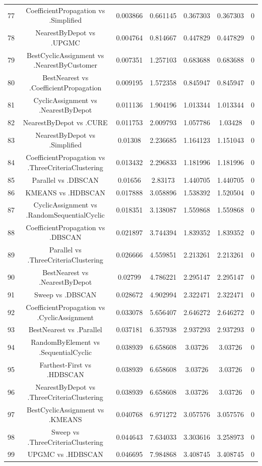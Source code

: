 \documentclass[a4paper,10pt]{article}
\begin{document}
\begin{landscape}
\begin{table}[!htp]
\begin{tabular}{ccccccc}
77&CoefficientPropagation vs .Simplified&0.003866&0.661145&0.367303&0.367303&0\\
78&NearestByDepot vs .UPGMC&0.004764&0.814667&0.447829&0.447829&0\\
79&BestCyclicAssignment vs .NearestByCustomer&0.007351&1.257103&0.683688&0.683688&0\\
80&BestNearest vs .CoefficientPropagation&0.009195&1.572358&0.845947&0.845947&0\\
81&CyclicAssignment vs .NearestByDepot&0.011136&1.904196&1.013344&1.013344&0\\
82&NearestByDepot vs .CURE&0.011753&2.009793&1.057786&1.03428&0\\
83&NearestByDepot vs .Simplified&0.01308&2.236685&1.164123&1.151043&0\\
84&CoefficientPropagation vs .ThreeCriteriaClustering&0.013432&2.296833&1.181996&1.181996&0\\
85&Parallel vs .DBSCAN&0.01656&2.83173&1.440705&1.440705&0\\
86&KMEANS vs .HDBSCAN&0.017888&3.058896&1.538392&1.520504&0\\
87&CyclicAssignment vs .RandomSequentialCyclic&0.018351&3.138087&1.559868&1.559868&0\\
88&CoefficientPropagation vs .DBSCAN&0.021897&3.744394&1.839352&1.839352&0\\
89&Parallel vs .ThreeCriteriaClustering&0.026666&4.559851&2.213261&2.213261&0\\
90&BestNearest vs .NearestByDepot&0.02799&4.786221&2.295147&2.295147&0\\
91&Sweep vs .DBSCAN&0.028672&4.902994&2.322471&2.322471&0\\
92&CoefficientPropagation vs .CyclicAssignment&0.033078&5.656407&2.646272&2.646272&0\\
93&BestNearest vs .Parallel&0.037181&6.357938&2.937293&2.937293&0\\
94&RandomByElement vs .SequentialCyclic&0.038939&6.658608&3.03726&3.03726&0\\
95&Farthest-First vs .HDBSCAN&0.038939&6.658608&3.03726&3.03726&0\\
96&NearestByDepot vs .ThreeCriteriaClustering&0.038939&6.658608&3.03726&3.03726&0\\
97&BestCyclicAssignment vs .KMEANS&0.040768&6.971272&3.057576&3.057576&0\\
98&Sweep vs .ThreeCriteriaClustering&0.044643&7.634033&3.303616&3.258973&0\\
99&UPGMC vs .HDBSCAN&0.046695&7.984868&3.408745&3.408745&0\\

\end{tabular}
\end{table}
\end{landscape}
\end{document}
